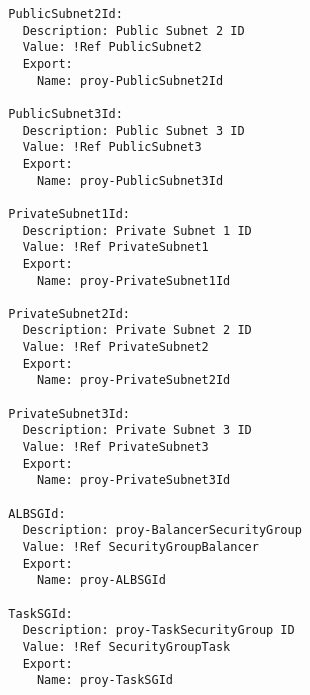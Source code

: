 \begin{verbatim}
  PublicSubnet2Id:
    Description: Public Subnet 2 ID
    Value: !Ref PublicSubnet2
    Export:
      Name: proy-PublicSubnet2Id

  PublicSubnet3Id:
    Description: Public Subnet 3 ID
    Value: !Ref PublicSubnet3
    Export:
      Name: proy-PublicSubnet3Id

  PrivateSubnet1Id:
    Description: Private Subnet 1 ID
    Value: !Ref PrivateSubnet1
    Export:
      Name: proy-PrivateSubnet1Id

  PrivateSubnet2Id:
    Description: Private Subnet 2 ID
    Value: !Ref PrivateSubnet2
    Export:
      Name: proy-PrivateSubnet2Id

  PrivateSubnet3Id:
    Description: Private Subnet 3 ID
    Value: !Ref PrivateSubnet3
    Export:
      Name: proy-PrivateSubnet3Id

  ALBSGId:
    Description: proy-BalancerSecurityGroup
    Value: !Ref SecurityGroupBalancer
    Export:
      Name: proy-ALBSGId

  TaskSGId:
    Description: proy-TaskSecurityGroup ID
    Value: !Ref SecurityGroupTask
    Export:
      Name: proy-TaskSGId
\end{verbatim}
